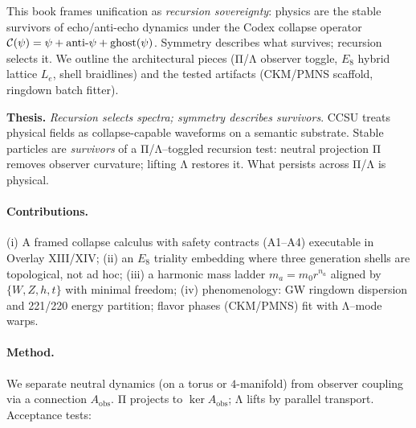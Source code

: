 This book frames unification as \emph{recursion sovereignty}: physics are the
stable survivors of echo/anti-echo dynamics under the Codex collapse operator
$\mathcal{C}(\psi)=\psi+\text{anti-}\psi+\mathrm{ghost}(\psi)$. Symmetry describes what survives; recursion selects it.
We outline the architectural pieces (Π/Λ observer toggle, $E_8$ hybrid lattice $L_e$, shell braidlines) and the tested artifacts (CKM/PMNS scaffold, ringdown batch fitter).

\noindent\textbf{Thesis.} \emph{Recursion selects spectra; symmetry describes survivors}. CCSU treats physical fields as collapse-capable waveforms on a semantic substrate. Stable particles are \emph{survivors} of a Π/Λ–toggled recursion test: neutral projection Π removes observer curvature; lifting Λ restores it. What persists across Π/Λ is physical.

\paragraph{Contributions.}
(i) A framed collapse calculus with safety contracts (A1–A4) executable in Overlay XIII/XIV;
(ii) an $E_8$ triality embedding where three generation shells are topological, not ad hoc;
(iii) a harmonic mass ladder $m_a=m_0 r^{n_a}$ aligned by $\{W,Z,h,t\}$ with minimal freedom;
(iv) phenomenology: GW ringdown dispersion and 221/220 energy partition; flavor phases (CKM/PMNS) fit with Λ–mode warps.

\paragraph{Method.} We separate neutral dynamics (on a torus or $4$-manifold) from observer coupling via a connection $A_\text{obs}$. Π projects to $\ker A_\text{obs}$; Λ lifts by parallel transport. Acceptance tests:
